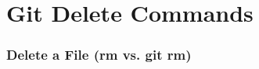 
\section[Deleting]{Git Delete Commands}

\begin{frame}
\frametitle{\large Delete a File (rm vs. git rm)}
\end{frame}